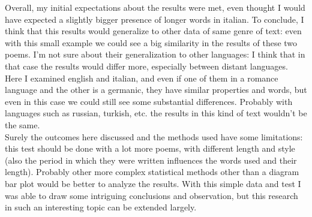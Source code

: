 Overall, my initial expectations about the results were met, even thought I would have expected a slightly bigger presence of longer words in italian. 
To conclude, I think that this results would generalize to other data of same genre of text: even with this small example we could see a  big similarity in the results of these two poems. 
I'm not sure about their generalization to other languages: I think that in that case the results would differ more, especially between distant languages. 
Here I examined english and italian, and even if one of them in a romance language and the other is a germanic, they have similar properties and words, but even in this case we could still see some substantial differences. 
Probably with languages such as russian, turkish, etc. the results in this kind of text wouldn't be the same.\\
Surely the outcomes here discussed and the methods used have some limitations: this test should be done with a lot more poems, with different length and style (also the period in which they were written influences the words used and their length).
Probably other more complex statistical methods other than a diagram bar plot would be better to analyze the results. 
With this simple data and test I was able to draw some intriguing conclusions and observation, but this research in such an interesting topic can be extended largely. 